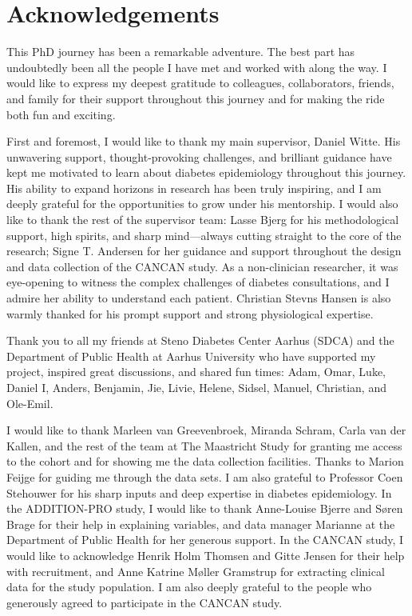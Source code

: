\documentclass[
  a4paper,
  headsepline=true,
  open=any]{scrbook}
\begin{document}

\hypertarget{acknowledgements}{%
\chapter*{Acknowledgements}\label{acknowledgements}}


This PhD journey has been a remarkable adventure. The best part has
undoubtedly been all the people I have met and worked with along the
way. I would like to express my deepest gratitude to colleagues,
collaborators, friends, and family for their support throughout this
journey and for making the ride both fun and exciting.

First and foremost, I would like to thank my main supervisor, Daniel
Witte. His unwavering support, thought-provoking challenges, and
brilliant guidance have kept me motivated to learn about diabetes
epidemiology throughout this journey. His ability to expand horizons in
research has been truly inspiring, and I am deeply grateful for the
opportunities to grow under his mentorship. I would also like to thank
the rest of the supervisor team: Lasse Bjerg for his methodological
support, high spirits, and sharp mind---always cutting straight to the
core of the research; Signe T. Andersen for her guidance and support
throughout the design and data collection of the CANCAN study. As a
non-clinician researcher, it was eye-opening to witness the complex
challenges of diabetes consultations, and I admire her ability to
understand each patient. Christian Stevns Hansen is also warmly thanked
for his prompt support and strong physiological expertise.

Thank you to all my friends at Steno Diabetes Center Aarhus (SDCA) and
the Department of Public Health at Aarhus University who have supported
my project, inspired great discussions, and shared fun times: Adam,
Omar, Luke, Daniel I, Anders, Benjamin, Jie, Livie, Helene, Sidsel,
Manuel, Christian, and Ole-Emil.

I would like to thank Marleen van Greevenbroek, Miranda Schram, Carla
van der Kallen, and the rest of the team at The Maastricht Study for
granting me access to the cohort and for showing me the data collection
facilities. Thanks to Marion Feijge for guiding me through the data
sets. I am also grateful to Professor Coen Stehouwer for his sharp
inputs and deep expertise in diabetes epidemiology. In the ADDITION-PRO
study, I would like to thank Anne-Louise Bjerre and Søren Brage for
their help in explaining variables, and data manager Marianne at the
Department of Public Health for her generous support. In the CANCAN
study, I would like to acknowledge Henrik Holm Thomsen and Gitte Jensen
for their help with recruitment, and Anne Katrine Møller Gramstrup for
extracting clinical data for the study population. I am also deeply
grateful to the people who generously agreed to participate in the
CANCAN study.
\end{document}
